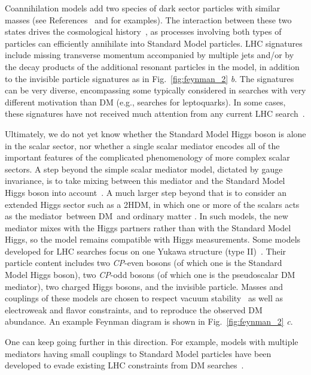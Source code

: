 \documentclass{ar-1col}
\newcommand{\IP}{invisible particle}
\begin{document}
{Coannihilation} models add two species of dark sector
particles with similar masses (see References~ and  for examples). 
The interaction between these two states drives the cosmological
history~\cite{Ellis:1999mm}, as processes involving both types of
particles can efficiently annihilate into Standard Model particles. LHC
signatures include missing transverse momentum accompanied by multiple jets
and/or by the decay products of the 
additional resonant particles in the model, in addition to the invisible particle signatures
as in Fig.~\ref{fig:feynman_2} \textit{b}.
The signatures can be very diverse, encompassing some typically
considered in searches with very different motivation than DM (e.g., searches for
leptoquarks). In some cases, these signatures have not received much attention from any
current LHC search~\cite{Buschmann:2016hkc}.

Ultimately, we do not yet know whether the Standard Model Higgs boson is alone 
in the scalar sector, nor whether a single scalar mediator
encodes all of the important features of the complicated
phenomenology of more {complex scalar sectors}. 
A step beyond the simple scalar mediator model, dictated by gauge invariance, 
is to take mixing between this mediator and the Standard Model Higgs boson
into account~\cite{Bauer:2016gys,Berlin:2014cfa}. A much larger
step beyond that is to consider an extended Higgs sector such as a
2HDM, in which one or more of the scalars
acts as the mediator~between DM\ and ordinary matter \cite{Bauer:2017ota,Goncalves:2016iyg,Bell:2016ekl}. 
In such models, the new mediator mixes with the Higgs partners
rather than with the Standard Model Higgs, so the model remains
compatible with Higgs measurements. 
Some models developed for LHC searches focus on one Yukawa structure (type II)~\cite{Pich:2009sp}. 
Their particle content includes two \textit{CP}-even bosons (of which one is the Standard Model Higgs
boson), two \textit{CP}-odd bosons (of which one is the pseudoscalar DM
mediator), two charged Higgs bosons, and the \IP. Masses and
couplings of these models are chosen to respect vacuum
stability~\cite{Goncalves:2016iyg} as well as electroweak and flavor
constraints, and to reproduce the observed DM abundance. An example Feynman diagram
is shown in Fig.~\ref{fig:feynman_2} \textit{c}.

One can keep going further in this direction. For example, 
{models with multiple mediators} having small couplings
to Standard Model particles have been developed to evade existing LHC
constraints from DM searches~\cite{Duerr:2016tmh}. 
\end{document}
